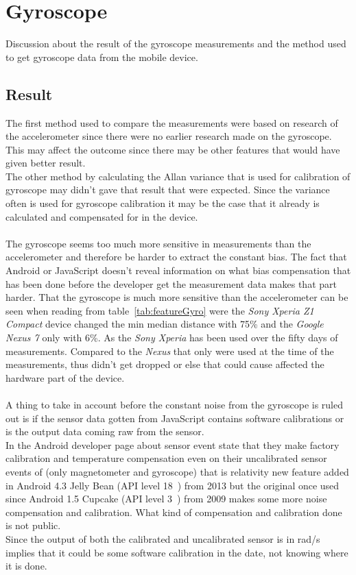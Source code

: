 \section{Gyroscope}
Discussion about the result of the gyroscope measurements and the method used to get gyroscope data from the mobile device.
\subsection{Result}
The first method used to compare the measurements were based on research of the accelerometer since there were no earlier research made on the gyroscope. This may affect the outcome since there may be other features that would have given better result. \\
The other method by calculating the Allan variance that is used for calibration of gyroscope may didn't gave that result that were expected. Since the variance often is used for gyroscope calibration it may be the case that it already is calculated and compensated for in the device.\\
\\
The gyroscope seems too much more sensitive in measurements than the accelerometer and therefore be harder to extract the constant bias. The fact that Android or JavaScript doesn't reveal information on what bias compensation that has been done before the developer get the measurement data makes that part harder. That the gyroscope is much more sensitive than the accelerometer can be seen when reading from table~\ref{tab:featureGyro} were the \textit{Sony Xperia Z1 Compact} device changed the min median distance with 75\% and the \textit{Google Nexus 7} only with 6\%. As the \textit{Sony Xperia} has been used over the fifty days of measurements. Compared to the \textit{Nexus} that only were used at the time of the measurements, thus didn't get dropped or else that could cause affected the hardware part of the device. \\
\\
A thing to take in account before the constant noise from the gyroscope is ruled out is if the sensor data gotten from JavaScript contains software calibrations or is the output data coming raw from the sensor. \\
In the Android developer page about sensor event \cite[]{android:sensorEvent} state that they make factory calibration and temperature compensation even on their uncalibrated sensor events of (only magnetometer and gyroscope) that is relativity new feature added in Android 4.3 Jelly Bean (API level 18~\cite{android:API18}) from 2013 but the original once used since Android 1.5 Cupcake (API level 3~\cite{android:API3}) from 2009 makes some more noise compensation and calibration. What kind of compensation and calibration done is not public. \\
Since the output of both the calibrated and uncalibrated sensor is in rad/s implies that it could be some software calibration in the date, not knowing where it is done.

